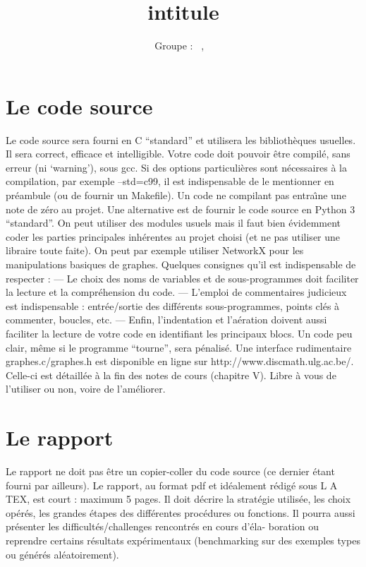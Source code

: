 \documentclass[a4paper, 11pt, oneside]{article}
\title{intitule}
\author{Groupe \GrNbr : \PrenomUN~\textsc{\NomUN}, \PrenomDEUX~\textsc{\NomDEUX}}
\date{}
\newcommand{\tablemat}{~}
\renewcommand{\tablemat}{\tableofcontents}
\begin{document}
\maketitle
\newpage
\tablemat
\newpage

\section{\textbf{Le code source}}

Le code source sera fourni en C “standard” et utilisera les bibliothèques
usuelles. Il sera correct, efficace et intelligible. Votre code doit pouvoir être
compilé, sans erreur (ni ‘warning’), sous gcc. Si des options particulières
sont nécessaires à la compilation, par exemple --std=c99, il est indispensable 
de le mentionner en préambule (ou de fournir un Makefile). Un code
ne compilant pas entraı̂ne une note de zéro au projet. Une alternative est de
fournir le code source en Python 3 “standard”. On peut utiliser des modules
usuels mais il faut bien évidemment coder les parties principales inhérentes
au projet choisi (et ne pas utiliser une libraire toute faite). On peut par
exemple utiliser NetworkX pour les manipulations basiques de graphes.
Quelques consignes qu’il est indispensable de respecter :
— Le choix des noms de variables et de sous-programmes doit faciliter la
lecture et la compréhension du code.
— L’emploi de commentaires judicieux est indispensable : entrée/sortie
des différents sous-programmes, points clés à commenter, boucles, etc.
— Enfin, l’indentation et l’aération doivent aussi faciliter la lecture de
votre code en identifiant les principaux blocs.
Un code peu clair, même si le programme “tourne”, sera pénalisé.
Une interface rudimentaire graphes.c/graphes.h est disponible en ligne
sur http://www.discmath.ulg.ac.be/. Celle-ci est détaillée à la fin des 
notes de cours (chapitre V). Libre à vous de l’utiliser ou non, voire de 
l’améliorer.

\section{\textbf{Le rapport}}
Le rapport ne doit pas être un copier-coller du code source (ce dernier
étant fourni par ailleurs). Le rapport, au format pdf et idéalement rédigé
sous L A TEX, est court : maximum 5 pages. Il doit décrire la stratégie utilisée,
les choix opérés, les grandes étapes des différentes procédures ou fonctions.
Il pourra aussi présenter les difficultés/challenges rencontrés en cours d’éla-
boration ou reprendre certains résultats expérimentaux (benchmarking sur
des exemples types ou générés aléatoirement).
\end{document}
